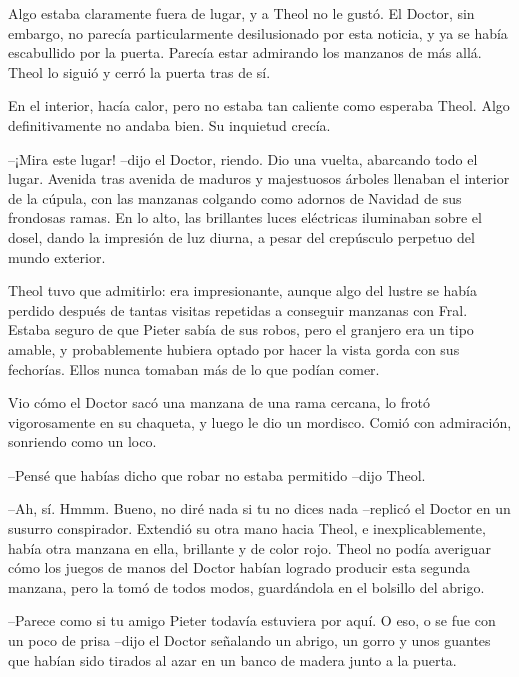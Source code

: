 Algo estaba claramente fuera de lugar, y a Theol no le gustó. El Doctor, sin embargo, no parecía particularmente desilusionado por esta noticia, y ya se había escabullido por la puerta. Parecía estar admirando los manzanos de más allá. Theol lo siguió y cerró la puerta tras de sí.



En el interior, hacía calor, pero no estaba tan caliente como esperaba Theol. Algo definitivamente no andaba bien. Su inquietud crecía.



--¡Mira este lugar! --dijo el Doctor, riendo. Dio una vuelta, abarcando todo el lugar. Avenida tras avenida de maduros y majestuosos árboles llenaban el interior de la cúpula, con las manzanas colgando como adornos de Navidad de sus frondosas ramas. En lo alto, las brillantes luces eléctricas iluminaban sobre el dosel, dando la impresión de luz diurna, a pesar del crepúsculo perpetuo del mundo exterior.



Theol tuvo que admitirlo: era impresionante, aunque algo del lustre se había perdido después de tantas visitas repetidas a conseguir manzanas con Fral. Estaba seguro de que Pieter sabía de sus robos, pero el granjero era un tipo amable, y probablemente hubiera optado por hacer la vista gorda con sus fechorías. Ellos nunca tomaban más de lo que podían comer.



Vio cómo el Doctor sacó una manzana de una rama cercana, lo frotó vigorosamente en su chaqueta, y luego le dio un mordisco. Comió con admiración, sonriendo como un loco.



--Pensé que habías dicho que robar no estaba permitido --dijo Theol.



--Ah, sí. Hmmm. Bueno, no diré nada si tu no dices nada --replicó el Doctor en un susurro conspirador. Extendió su otra mano hacia Theol, e inexplicablemente, había otra manzana en ella, brillante y de color rojo. Theol no podía averiguar cómo los juegos de manos del Doctor habían logrado producir esta segunda manzana, pero la tomó de todos modos, guardándola en el bolsillo del abrigo.



--Parece como si tu amigo Pieter todavía estuviera por aquí. O eso, o se fue con un poco de prisa --dijo el Doctor señalando un abrigo, un gorro y unos guantes que habían sido tirados al azar en un banco de madera junto a la puerta.


